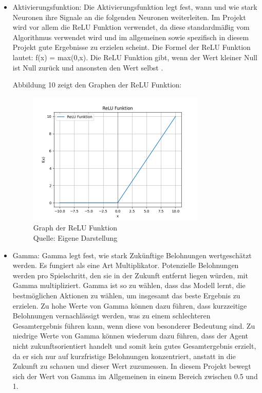 \begin{itemize}
\item Aktivierungsfunktion: Die Aktivierungsfunktion legt fest, wann und wie stark Neuronen ihre Signale an die folgenden Neuronen weiterleiten. Im Projekt wird vor allem die ReLU Funktion verwendet, da diese standardmäßig vom Algorithmus verwendet wird und im allgemeinen sowie spezifisch in diesem Projekt gute Ergebnisse zu erzielen scheint. Die Formel der ReLU Funktion lautet: f(x) = max(0,x). Die ReLU Funktion gibt, wenn der Wert kleiner Null ist Null zurück und ansonsten den Wert selbst \cite{schmidt-hieber_nonparametric_2020}.

Abbildung 10 zeigt den Graphen der ReLU Funktion:
\nopagebreak
\begin{figure}[H]
	\includegraphics[width=0.8\textwidth]{Bilder/ReLU} 
	\caption[Graph der ReLU Funktion]{Graph der ReLU Funktion\\ Quelle: Eigene Darstellung}
\end{figure}

\item Gamma: Gamma legt fest, wie stark Zukünftige Belohnungen wertgeschätzt werden. Es fungiert als eine Art Multiplikator. Potenzielle Belohnungen werden pro Spielschritt, den sie in der Zukunft entfernt liegen würden, mit Gamma multipliziert. Gamma ist so zu wählen, dass das Modell lernt, die bestmöglichen Aktionen zu wählen, um insgesamt das beste Ergebnis zu erzielen. Zu hohe Werte von Gamma können dazu führen, dass kurzzeitige Belohnungen vernachlässigt werden, was zu einem schlechteren Gesamtergebnis führen kann, wenn diese von besonderer Bedeutung sind. Zu niedrige Werte von Gamma können wiederum dazu führen, dass der Agent nicht zukunftsorientiert handelt und somit kein gutes Gesamtergebnis erzielt, da er sich nur auf kurzfristige Belohnungen konzentriert, anstatt in die Zukunft zu schauen und dieser Wert zuzumessen. In diesem Projekt bewegt sich der Wert von Gamma im Allgemeinen in einem Bereich zwischen 0.5 und 1.


\end{itemize}
